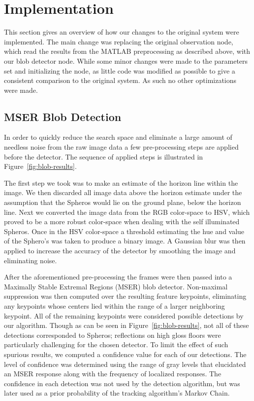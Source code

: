\section{Implementation}
\label{sec:impl}

This section gives an overview of how our changes to the original system were implemented. The main change was replacing the
original observation node, which read the results from the MATLAB preprocessing as described above, with our blob detector
node. While some minor changes were made to the parameters set and initializing the node, as little code was modified as
possible to give a consistent comparison to the original system. As such no other optimizations were made.

\subsection{MSER Blob Detection}
In order to quickly reduce the search space and eliminate a large amount of needless noise from the raw image data a few
pre-processing steps are applied before the detector. The sequence of applied steps is illustrated in Figure~\ref{fig:blob-results}.

The first step we took was to make an estimate of the horizon line within the image. We then discarded all image data above the
horizon estimate under the assumption that the Spheros would lie on the ground plane, below the horizon line. Next we
converted the image data from the RGB color-space to HSV, which proved to be a more robust color-space when dealing with
the self illuminated Spheros. Once in the HSV color-space a threshold estimating the hue and value of the Sphero's was taken to
produce a binary image. A Gaussian blur was then applied to increase the accuracy of the detector by smoothing the image and
eliminating noise.

After the aforementioned pre-processing the frames were then passed into a Maximally Stable Extremal Regions (MSER) blob
detector. Non-maximal suppression was then computed over the resulting feature keypoints, eliminating any keypoints whose
centers lied within the range of a larger neighboring keypoint. All of the remaining keypoints were considered possible detections
by our algorithm. Though as can be seen in Figure~\ref{fig:blob-results}, not all of these detections corresponded to Spheros;
reflections on high gloss floors were particularly challenging for the chosen detector. To limit the effect of such spurious results,
we computed a confidence value for each of our detections. The level of confidence was determined using the range of gray
levels that elucidated an MSER response along with the frequency of localized responses. The confidence in each detection was
not used by the detection algorithm, but was later used as a prior probability of the tracking algorithm's Markov Chain.

